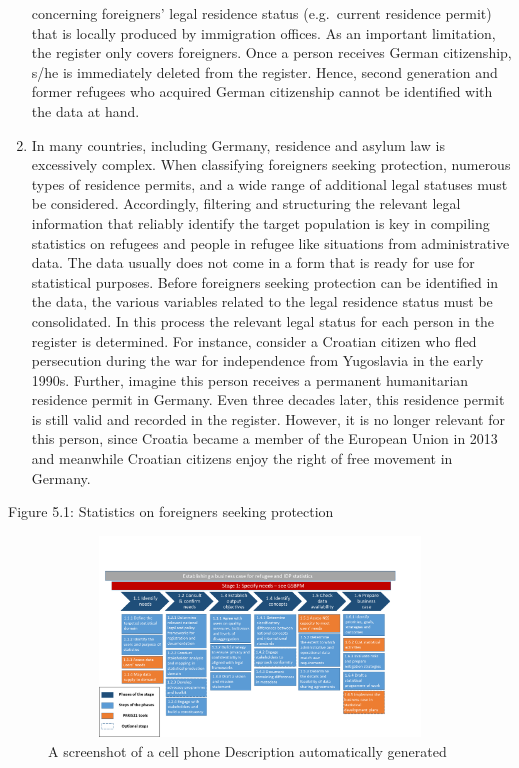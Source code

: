 \documentclass[
]{article}
\begin{document}
\begin{enumerate}
  concerning foreigners' legal residence status (e.g.~current
  residence permit) that is locally produced by immigration offices.
  As an important limitation, the register only covers foreigners.
  Once a person receives German citizenship, s/he is immediately
  deleted from the register. Hence, second generation and former
  refugees who acquired German citizenship cannot be identified with
  the data at hand.
\item
  In many countries, including Germany, residence and asylum law is
  excessively complex. When classifying foreigners seeking protection,
  numerous types of residence permits, and a wide range of additional
  legal statuses must be considered. Accordingly, filtering and
  structuring the relevant legal information that reliably identify
  the target population is key in compiling statistics on refugees and
  people in refugee like situations from administrative data. The data
  usually does not come in a form that is ready for use for
  statistical purposes. Before foreigners seeking protection can be
  identified in the data, the various variables related to the legal
  residence status must be consolidated. In this process the relevant
  legal status for each person in the register is determined. For
  instance, consider a Croatian citizen who fled persecution during
  the war for independence from Yugoslavia in the early 1990s.
  Further, imagine this person receives a permanent humanitarian
  residence permit in Germany. Even three decades later, this
  residence permit is still valid and recorded in the register.
  However, it is no longer relevant for this person, since Croatia
  became a member of the European Union in 2013 and meanwhile Croatian
  citizens enjoy the right of free movement in Germany.
\end{enumerate}

Figure 5.1: Statistics on foreigners seeking protection

\begin{figure}
\centering
\includegraphics[width=6.23056in,height=2.09923in]{media/image1.png}
\caption{A screenshot of a cell phone Description automatically
generated}
\end{figure}
\end{document}
